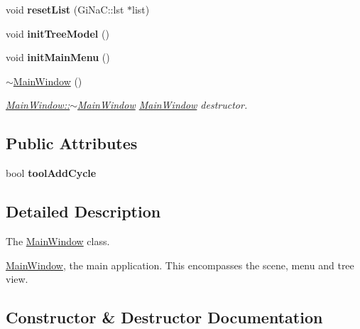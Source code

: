 \begin{DoxyCompactItemize}
void {\bfseries reset\+List} (Gi\+Na\+C\+::lst $\ast$list)
\item 
\mbox{\label{class_main_window_a3e45090789e16c49079857ab0617b239}} 
void {\bfseries init\+Tree\+Model} ()
\item 
\mbox{\label{class_main_window_ae78352e402084a7c6518e97056070677}} 
void {\bfseries init\+Main\+Menu} ()
\item 
\mbox{\label{class_main_window_ae98d00a93bc118200eeef9f9bba1dba7}} 
\mbox{\hyperlink{class_main_window_ae98d00a93bc118200eeef9f9bba1dba7}{$\sim$\+Main\+Window}} ()
\begin{DoxyCompactList}\small\item\em \mbox{\hyperlink{class_main_window_ae98d00a93bc118200eeef9f9bba1dba7}{Main\+Window\+::$\sim$\+Main\+Window}} \mbox{\hyperlink{class_main_window}{Main\+Window}} destructor. \end{DoxyCompactList}\end{DoxyCompactItemize}
\subsection*{Public Attributes}
\begin{DoxyCompactItemize}
\item 
\mbox{\label{class_main_window_ada1631bee647fb176facf5077da7f91c}} 
bool {\bfseries tool\+Add\+Cycle}
\end{DoxyCompactItemize}


\subsection{Detailed Description}
The \mbox{\hyperlink{class_main_window}{Main\+Window}} class. 

\mbox{\hyperlink{class_main_window}{Main\+Window}}, the main application. This encompasses the scene, menu and tree view. 

\subsection{Constructor \& Destructor Documentation}
\mbox{\label{class_main_window_a8b244be8b7b7db1b08de2a2acb9409db}} 
